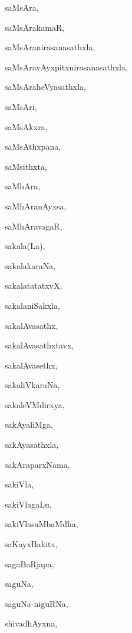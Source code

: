 \begin{multicols}{2}
{saMsAra}, \pageref{saMsAra}

{saMsArakamaR}, \pageref{saMsArakamaR}

{saMsAranirasanasathxla}, \pageref{saMsAranirasanasathxla}

{saMsAravAyxpitxnirasanasathxla}, \pageref{saMsAravAyxpitxnirasanasathxla}

{saMsAraheVyasathxla}, \pageref{saMsAraheVyasathxla}

{saMsAri}, \pageref{saMsAri}

{saMsAkxra}, \pageref{saMsAkxra}

{saMsAthxpana}, \pageref{saMsAthxpana}

{saMsithxta}, \pageref{saMsithxta}

{saMhAra}, \pageref{saMhAra}

{saMhAranAyxsa}, \pageref{saMhAranAyxsa}

{saMhAravagaR}, \pageref{saMhAravagaR}

{sakala(La)}, \pageref{sakalaLa}

{sakalakaraNa}, \pageref{sakalakaraNa}

{sakalatatatxvX}, \pageref{sakalatatatxvX}

{sakalaniSakxla}, \pageref{sakalaniSakxla}

{sakalAvasathx}, \pageref{sakalAvasathx}

{sakalAvasathxtavx}, \pageref{sakalAvasathxtavx}

{sakalAvasethx}, \pageref{sakalAvasethx}

{sakaliVkaraNa}, \pageref{sakaliVkaraNa}

{sakaleVMdirxya}, \pageref{sakaleVMdirxya}

{sakAyaliMga}, \pageref{sakAyaliMga}

{sakAyasathxla}, \pageref{sakAyasathxla}

{sakAraparxNama}, \pageref{sakAraparxNama}

{sakiVla}, \pageref{sakiVla}

{sakiVlagaLu}, \pageref{sakiVlagaLu}

{sakiVlasaMbaMdha}, \pageref{sakiVlasaMbaMdha}

{saKayxBakitx}, \pageref{saKayxBakitx}

{sagaBaRjapa}, \pageref{sagaBaRjapa}

{saguNa}, \pageref{saguNa}

{saguNa-niguRNa}, \pageref{saguNa-niguRNa}

{shivadhAyxna}, \pageref{shivadhAyxna}


\end{multicols}
